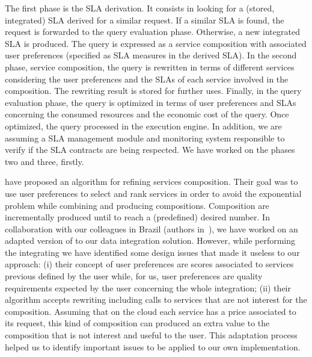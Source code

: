\documentclass[11pt,a4paper,oneside]{report}
\begin{document}
The first phase is the SLA derivation. It consists in looking for a (stored, integrated) SLA derived for a similar request. If a similar SLA is found, the request is forwarded to the query evaluation phase. Otherwise, a new integrated SLA is produced. The query is expressed as a service composition with associated user preferences (specified as SLA measures in the derived SLA). In the second phase, service composition, the query is rewritten in terms of different services considering the user preferences and the SLAs of each service involved in the composition. The rewriting result is stored for further uses. Finally, in the query evaluation phase, the query is optimized in terms of user preferences and SLAs concerning the consumed resources and the economic cost of the query. Once optimized, the query processed in the execution engine. In addition, we are assuming a SLA management module and monitoring system responsible to verify if the SLA contracts are being respected. We have worked on the phases two and three, firstly. 
	
\cite{ba2014} have proposed an algorithm for refining services composition. Their goal was to use user preferences to select and rank services in order to avoid the exponential problem while combining and producing compositions. Composition are incrementally produced until to reach a (predefined) desired number. In collaboration with our colleagues in Brazil (authors in~\cite{ba2014}), we have worked on an adapted version of \cite{ba2014} to our data integration solution. However, while performing the integrating we have identified some design issues that made it useless to our approach: (i) their concept of user preferences are scores associated to services previous defined by the user while, for us, user preferences are quality requirements expected by the user concerning the whole integration; (ii) their algorithm accepts rewriting including calls to services that are not interest for the composition. Assuming that on the cloud each service has a price associated to its request, this kind of composition can produced an extra value to the composition that is not interest and useful to the user. This adaptation process helped us to identify important issues to be applied to our own implementation.

\end{document}
